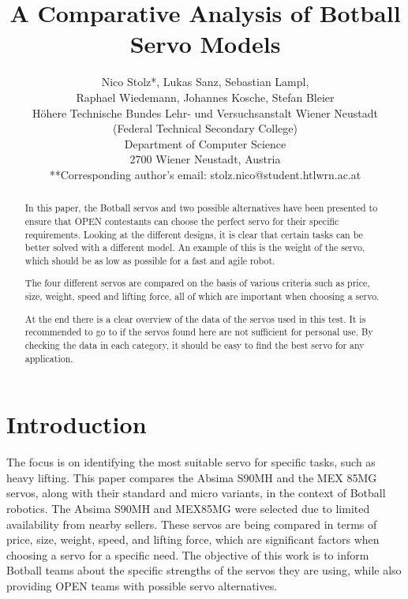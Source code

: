 \documentclass[conference]{IEEEtran}
\begin{document}
\title
{
    A Comparative Analysis of Botball Servo Models\\
}

\author
{
    Nico Stolz*, Lukas Sanz, Sebastian Lampl,\\
    Raphael Wiedemann, Johannes Kosche, Stefan Bleier\\
    Höhere Technische Bundes Lehr- und Versuchsanstalt Wiener Neustadt\\
    (Federal Technical Secondary College)\\
    Department of Computer Science\\
    2700 Wiener Neustadt, Austria\\
    **Corresponding author's email: stolz.nico@student.htlwrn.ac.at\\
}

\maketitle
\begin{abstract}
    In this paper, the Botball servos and two possible alternatives have been presented to ensure that OPEN contestants can choose the perfect servo for their specific requirements. Looking at the different designs, it is clear that certain tasks can be better solved with a different model. An example of this is the weight of the servo, which should be as low as possible for a fast and agile robot.

    The four different servos are compared on the basis of various criteria such as price, size, weight, speed and lifting force, all of which are important when choosing a servo.

    At the end there is a clear overview of the data of the servos used in this test. It is recommended to go to \cite{b2} if the servos found here are not sufficient for personal use. By checking the data in each category, it should be easy to find the best servo for any application.

\end{abstract}

\section{Introduction}
    The focus is on identifying the most suitable servo for specific tasks, such as heavy lifting. This paper compares the Absima S90MH and the MEX 85MG servos, along with their standard and micro variants, in the context of Botball robotics. The Absima S90MH and MEX85MG were selected due to limited availability from nearby sellers. These servos are being compared in terms of price, size, weight, speed, and lifting force, which are significant factors when choosing a servo for a specific need. The objective of this work is to inform Botball teams about the specific strengths of the servos they are using, while also providing OPEN teams with possible servo alternatives.
\end{document}
